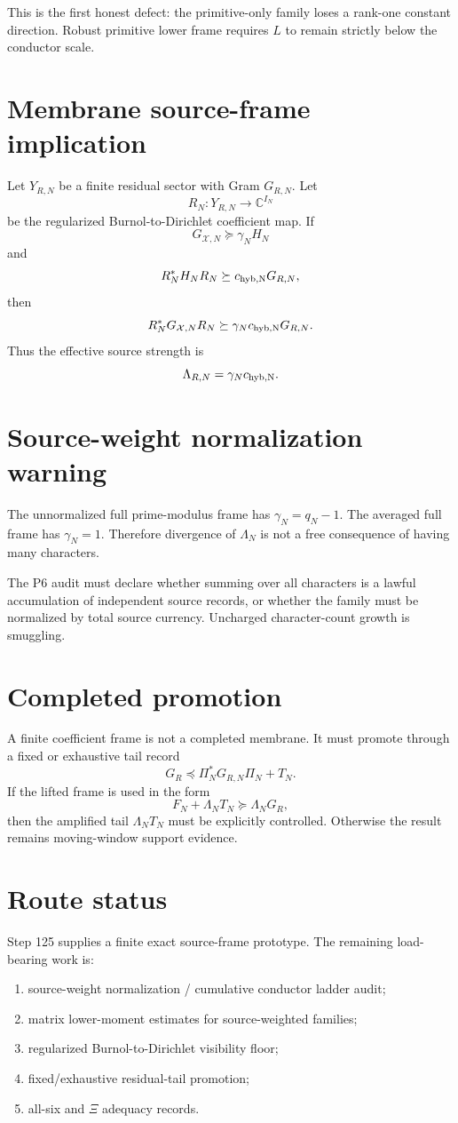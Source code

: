 \documentclass[11pt]{article}
\newcommand{\C}{\mathbb C}
\begin{document}
This is the first honest defect: the primitive-only family loses a rank-one constant direction.  Robust primitive lower frame requires $L$ to remain strictly below the conductor scale.

\section{Membrane source-frame implication}
Let $Y_{R,N}$ be a finite residual sector with Gram $G_{R,N}$.  Let
\[
  R_N:Y_{R,N}\to\C^{I_N}
\]
be the regularized Burnol-to-Dirichlet coefficient map.  If
\[
  G_{\mathcal X,N}\succeq \gamma_N H_N
\]
and
\[
  R_N^*H_NR_N\succeq c_{\rm hyb,N}G_{R,N},
\]
then
\[
  R_N^*G_{\mathcal X,N}R_N\succeq \gamma_N c_{\rm hyb,N}G_{R,N}.
\]
Thus the effective source strength is
\[
  \Lambda_{R,N}=\gamma_N c_{\rm hyb,N}.
\]

\section{Source-weight normalization warning}
The unnormalized full prime-modulus frame has $\gamma_N=q_N-1$.  The averaged full frame has $\gamma_N=1$.  Therefore divergence of $\Lambda_N$ is not a free consequence of having many characters.

The P6 audit must declare whether summing over all characters is a lawful accumulation of independent source records, or whether the family must be normalized by total source currency.  Uncharged character-count growth is smuggling.

\section{Completed promotion}
A finite coefficient frame is not a completed membrane.  It must promote through a fixed or exhaustive tail record
\[
  G_R\preceq \Pi_N^*G_{R,N}\Pi_N+T_N.
\]
If the lifted frame is used in the form
\[
  F_N+\Lambda_NT_N\succeq \Lambda_NG_R,
\]
then the amplified tail $\Lambda_NT_N$ must be explicitly controlled.  Otherwise the result remains moving-window support evidence.

\section{Route status}
Step 125 supplies a finite exact source-frame prototype.  The remaining load-bearing work is:
\begin{enumerate}[leftmargin=1.5em]
\item source-weight normalization / cumulative conductor ladder audit;
\item matrix lower-moment estimates for source-weighted families;
\item regularized Burnol-to-Dirichlet visibility floor;
\item fixed/exhaustive residual-tail promotion;
\item all-six and $\Xi$ adequacy records.
\end{enumerate}
\end{document}
